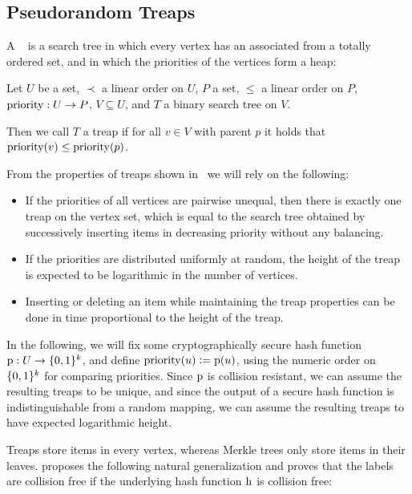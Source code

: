 \subsection{Pseudorandom Treaps}

A ~\cite{seidel1996randomized} is a search tree in which every vertex has an associated  from a totally ordered set, and in which the priorities of the vertices form a heap:

\begin{definition}
Let $U$ be a set, $\prec$ a linear order on $U$, $P$ a set, $\leq$ a linear order on $P$, ${\operatorname{priority}}: {U} \rightarrow {P}$, $V \subseteq U$, and $T$ a binary search tree on $V$.

Then we call $T$ a treap if for all $v \in V$ with parent $p$ it holds that $\operatorname{priority}(v) \leq \operatorname{priority}(p)$.
\end{definition}

From the properties of treaps shown in~\cite{seidel1996randomized} we will rely on the following:

\begin{itemize}
  \item If the priorities of all vertices are pairwise unequal, then there is exactly one treap on the vertex set, which is equal to the search tree obtained by successively inserting items in decreasing priority without any balancing.
  \item If the priorities are distributed uniformly at random, the height of the treap is expected to be logarithmic in the number of vertices.
  \item Inserting or deleting an item while maintaining the treap properties can be done in time proportional to the height of the treap.
\end{itemize}

In the following, we will fix some cryptographically secure hash function ${\operatorname{p}}: {U} \rightarrow {\{0, 1\}^k}$, and define $\operatorname{priority}(u) \vcentcolon= \operatorname{p}(u)$, using the numeric order on $\{0, 1\}^k$ for comparing priorities. Since $\operatorname{p}$ is collision resistant, we can assume the resulting treaps to be unique, and since the output of a secure hash function is indistinguishable from a random mapping, we can assume the resulting treaps to have expected logarithmic height.

Treaps store items in every vertex, whereas Merkle trees only store items in their leaves. \cite{buldas2002eliminating} proposes the following natural generalization and proves that the labels are collision free if the underlying hash function $\operatorname{h}$ is collision free:

